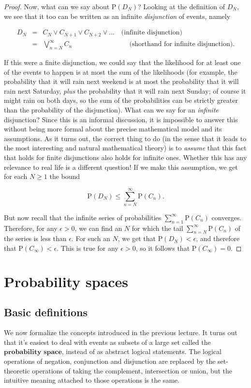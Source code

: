\documentclass[11pt]{report}
\theoremstyle{plain}
\theoremstyle{definition}
\begin{document}
\begin{proof}
Now, what can we say about $\mathrm{P}(D_N)$?
Looking at the definition of $D_N$, we see that it
too can be written as an infinite \emph{disjunction} of
events, namely

\begin{eqnarray*}
D_N &=& C_N \vee C_{N+1} \vee C_{N+2} \vee \ldots \quad \textrm{(infinite disjunction)} \\
&=& \bigvee_{n=N}^\infty C_n \qquad\qquad\qquad\qquad\ \  \textrm{(shorthand for infinite disjunction)}.
\end{eqnarray*}

If this were a finite disjunction, we could say that
the likelihood for at least one of the events to
happen is at most the sum of the likelihoods (for
example, the probability that it will rain next
weekend is at most the probability that it will rain
next Saturday, \emph{plus} the probability that it will
rain next Sunday; of course it might rain on both
days, so the sum of the probabilities can be strictly
greater than the probability of the disjunction). What
can we say for an \emph{infinite} disjunction? Since this
is an informal discussion, it is impossible to answer
this without being more formal about the precise
mathematical model and its assumptions. As it turns
out, the correct thing to do (in the sense that it
leads to the most interesting and natural mathematical
theory) is to \emph{assume} that this fact that holds for
finite disjunctions also holds for infinite ones.
Whether this has any relevance to real life is a
different question! If we make this assumption, we get
for each $N\ge 1$ the bound

\[
\mathrm{P}(D_N) \le \sum_{n=N}^\infty \mathrm{P}(C_n).
\]

But now recall that the infinite series of
probabilities $\sum_{n=1}^\infty \mathrm{P}(C_n)$
converges. Therefore, for any $\epsilon>0$, we can
find an $N$ for which the tail
$\sum_{n=N}^\infty \mathrm{P}(C_n)$ of the series is
less than $\epsilon$. For such an $N$, we get that
$\mathrm{P}(D_N)< \epsilon$, and therefore that
$\mathrm{P}(C_\infty)<\epsilon$. This is true for any
$\epsilon>0$, so it follows that
$\mathrm{P}(C_\infty)=0$.
\end{proof}

\chapter{Probability spaces}

\section{Basic definitions}
\label{basic-def}
We now formalize the concepts introduced in the
previous lecture. It turns out that it's easiest to
deal with events as subsets of a large set called the
$\textbf{probability space}$, instead of as abstract
logical statements. The logical operations of
negation, conjunction and disjunction are replaced by
the set-theoretic operations of taking the complement,
intersection or union, but the intuitive meaning
attached to those operations is the same.
\end{document}
